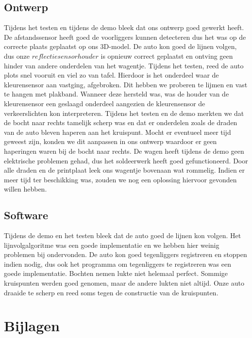 \documentclass[a4paper,twoside,kulak]{kulakreport}
\begin{document}
\subsection{Ontwerp}
Tijdens het testen en tijdens de demo bleek dat ons ontwerp goed gewerkt heeft. De afstandssensor heeft goed de voorliggers kunnen detecteren dus het was op de correcte plaats geplaatst op ons 3D-model. De auto kon goed de lijnen volgen, dus onze $reflectiesensorhouder$ is opnieuw correct geplaatst en ontving geen hinder van andere onderdelen van het wagentje. Tijdens het testen, reed de auto plots snel vooruit en viel zo van tafel. Hierdoor is het onderdeel waar de kleurensensor aan vastging, afgebroken. Dit hebben we proberen te lijmen en vast te hangen met plakband. Wanneer deze hersteld was, was de houder van de kleurensensor een geslaagd onderdeel aangezien de kleurensensor de verkeerslichten kon interpreteren. Tijdens het testen en de demo merkten we dat de bocht naar rechts tamelijk scherp was en dat er onderdelen zoals de draden van de auto bleven haperen aan het kruispunt. Mocht er eventueel meer tijd geweest zijn, konden we dit aanpassen in ons ontwerp waardoor er geen haperingen waren bij de bocht naar rechts. De wagen heeft tijdens de demo geen elektrische problemen gehad, dus het soldeerwerk heeft goed gefunctioneerd. Door alle draden en de printplaat leek ons wagentje bovenaan wat rommelig. Indien er meer tijd ter beschikking was, zouden we nog een oplossing hiervoor gevonden willen hebben. 

\subsection{Software}
Tijdens de demo en het testen bleek dat de auto goed de lijnen kon volgen. Het lijnvolgalgoritme was een goede implementatie en we hebben hier weinig problemen bij ondervonden. De auto kon goed tegenliggers registreren en stoppen indien nodig, dus ook het programma om tegenliggers te registreren was een goede implementatie. Bochten nemen lukte niet helemaal perfect. Sommige kruispunten werden goed genomen, maar de andere lukten niet altijd. Onze auto draaide te scherp en reed soms tegen de constructie van de kruispunten.


\newpage
	\section{Bijlagen}
	
\end{document}
